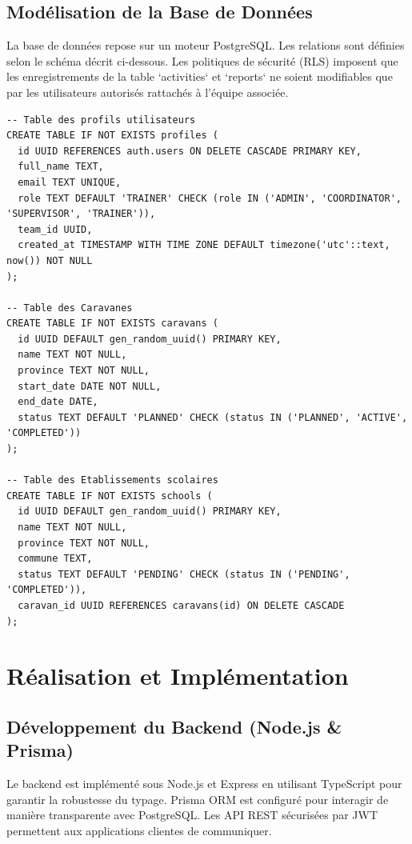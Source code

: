 \documentclass[12pt,a4paper]{report}
\begin{document}
\section{Modélisation de la Base de Données}
La base de données repose sur un moteur PostgreSQL. Les relations sont définies selon le schéma décrit ci-dessous. Les politiques de sécurité (RLS) imposent que les enregistrements de la table `activities` et `reports` ne soient modifiables que par les utilisateurs autorisés rattachés à l'équipe associée.

\begin{lstlisting}[caption={Extrait du script SQL de définition de la base de données Supabase}, label={lst:db_schema}]
-- Table des profils utilisateurs
CREATE TABLE IF NOT EXISTS profiles (
  id UUID REFERENCES auth.users ON DELETE CASCADE PRIMARY KEY,
  full_name TEXT,
  email TEXT UNIQUE,
  role TEXT DEFAULT 'TRAINER' CHECK (role IN ('ADMIN', 'COORDINATOR', 'SUPERVISOR', 'TRAINER')),
  team_id UUID,
  created_at TIMESTAMP WITH TIME ZONE DEFAULT timezone('utc'::text, now()) NOT NULL
);

-- Table des Caravanes
CREATE TABLE IF NOT EXISTS caravans (
  id UUID DEFAULT gen_random_uuid() PRIMARY KEY,
  name TEXT NOT NULL,
  province TEXT NOT NULL,
  start_date DATE NOT NULL,
  end_date DATE,
  status TEXT DEFAULT 'PLANNED' CHECK (status IN ('PLANNED', 'ACTIVE', 'COMPLETED'))
);

-- Table des Etablissements scolaires
CREATE TABLE IF NOT EXISTS schools (
  id UUID DEFAULT gen_random_uuid() PRIMARY KEY,
  name TEXT NOT NULL,
  province TEXT NOT NULL,
  commune TEXT,
  status TEXT DEFAULT 'PENDING' CHECK (status IN ('PENDING', 'COMPLETED')),
  caravan_id UUID REFERENCES caravans(id) ON DELETE CASCADE
);
\end{lstlisting}

\chapter{Réalisation et Implémentation}

\section{Développement du Backend (Node.js \& Prisma)}
Le backend est implémenté sous Node.js et Express en utilisant TypeScript pour garantir la robustesse du typage. Prisma ORM est configuré pour interagir de manière transparente avec PostgreSQL. Les API REST sécurisées par JWT permettent aux applications clientes de communiquer.
\end{document}
